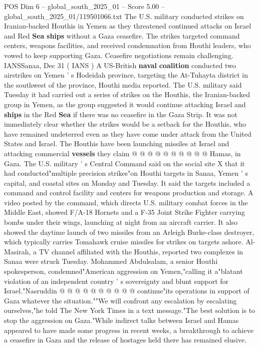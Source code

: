 \begin{textsample}{POS Dim 6 – global\_south\_2025\_01 – Score 5.00 – global\_south\_2025\_01/119501066.txt}  \label{ex:f6_pos_441}
The U.S. military conducted strikes on Iranian-backed Houthis in Yemen as they threatened continued attacks on Israel and Red \textbf{Sea} \textbf{ships} without a Gaza ceasefire.
The strikes targeted command centers, weapons facilities, and received condemnation from Houthi leaders, who vowed to keep supporting Gaza.
Ceasefire negotiations remain challenging.
IANSSanaa, Dec 31 ( IANS ) A US-British \textbf{naval} \textbf{coalition} conducted two airstrikes on Yemen ' s Hodeidah province, targeting the At-Tuhayta district in the southwest of the province, Houthi media reported.
The U.S. military said Tuesday it had carried out a series of strikes on the Houthis, the Iranian-backed group in Yemen, as the group suggested it would continue attacking Israel and \textbf{ships} in the Red \textbf{Sea} if there was no ceasefire in the Gaza Strip.
It was not immediately clear whether the strikes would be a setback for the Houthis, who have remained undeterred even as they have come under attack from the United States and Israel.
The Houthis have been launching missiles at Israel and attacking commercial \textbf{vessels} they claim @ @ @ @ @ @ @ @ @ @ Hamas, in Gaza.
The U.S. military ' s Central Command said on the social site X that it had conducted"multiple precision strikes"on Houthi targets in Sanaa, Yemen ' s capital, and coastal sites on Monday and Tuesday.
It said the targets included a command and control facility and centers for weapons production and storage.
A video posted by the command, which directs U.S. military combat forces in the Middle East, showed F/A-18 Hornets and a F-35 Joint Strike Fighter carrying bombs under their wings, launching at night from an aircraft carrier.
It also showed the daytime launch of two missiles from an Arleigh Burke-class destroyer, which typically carries Tomahawk cruise missiles for strikes on targets ashore.
Al-Masirah, a TV channel affiliated with the Houthis, reported two complexes in Sanaa were struck Tuesday.
Mohammed Abdulsalam, a senior Houthi spokesperson, condemned"American aggression on Yemen,"calling it a"blatant violation of an independent country ' s sovereignty and blunt support for Israel."Nasruddin @ @ @ @ @ @ @ @ @ @ continue"its operations in support of Gaza whatever the situation.""We will confront any escalation by escalating ourselves,"he told The New York Times in a text message."The best solution is to stop the aggression on Gaza."While indirect talks between Israel and Hamas appeared to have made some progress in recent weeks, a breakthrough to achieve a ceasefire in Gaza and the release of hostages held there has remained elusive.

\end{textsample}
